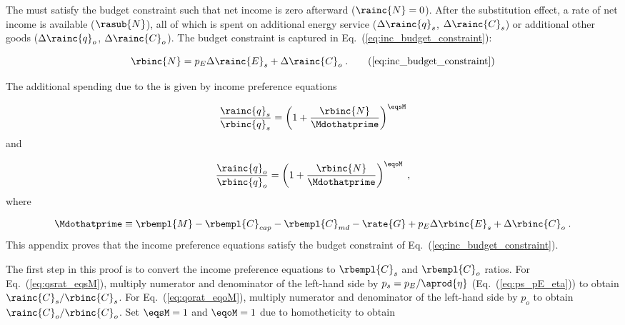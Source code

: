 

The \inceffect{} must satisfy the budget constraint
such that net income is zero afterward ($\rainc{N} = 0$).
After the substitution effect, 
a rate of net income is available ($\rasub{N}$), 
all of which is spent on
additional energy service ($\Delta \rainc{q}_s$, $\Delta \rainc{C}_s$) or 
additional other goods ($\Delta \rainc{q}_o$, $\Delta \rainc{C}_o$).
The budget constraint is captured in Eq.~(\ref{eq:inc_budget_constraint}): 

\begin{equation}
  \rbinc{N} = p_E \Delta \rainc{E}_s + \Delta \rainc{C}_o \; . \tag{\ref{eq:inc_budget_constraint}}
\end{equation}

The additional spending due to the \inceffect{} is given by income preference equations

\begin{equation} \label{eq:qsrat_eqsM}
  \frac{\rainc{q}_s}{\rbinc{q}_s} = \left( 1 + \frac{\rbinc{N}}{\Mdothatprime}  \right) ^{\eqsM}
\end{equation}
%
and

\begin{equation} \label{eq:qorat_eqoM}
  \frac{\rainc{q}_o}{\rbinc{q}_o} = \left( 1 + \frac{\rbinc{N}}{\Mdothatprime}  \right) ^{\eqoM} \; ,
\end{equation}
%
where

\begin{equation}
  \Mdothatprime \equiv \rbempl{M} - \rbempl{C}_{cap} - \rbempl{C}_{md} 
                       - \rate{G} + p_E \Delta \rbinc{E}_s + \Delta \rbinc{C}_o \; .
\end{equation}
%
This appendix proves that the income preference equations
satisfy the budget constraint of Eq.~(\ref{eq:inc_budget_constraint}).

The first step in this proof is to convert 
the income preference equations
to $\rbempl{C}_s$ and $\rbempl{C}_o$ ratios.
For Eq.~(\ref{eq:qsrat_eqsM}), 
multiply numerator and denominator of the left-hand side by $p_s = p_E / \aprod{\eta}$
(Eq.~(\ref{eq:ps_pE_eta}))
to obtain $\rainc{C}_s / \rbinc{C}_s$.
For Eq.~(\ref{eq:qorat_eqoM}), 
multiply numerator and denominator of the left-hand side by $p_o$
to obtain $\rainc{C}_o / \rbinc{C}_o$.
Set $\eqsM = 1$ and $\eqoM = 1$ due to homotheticity to obtain

